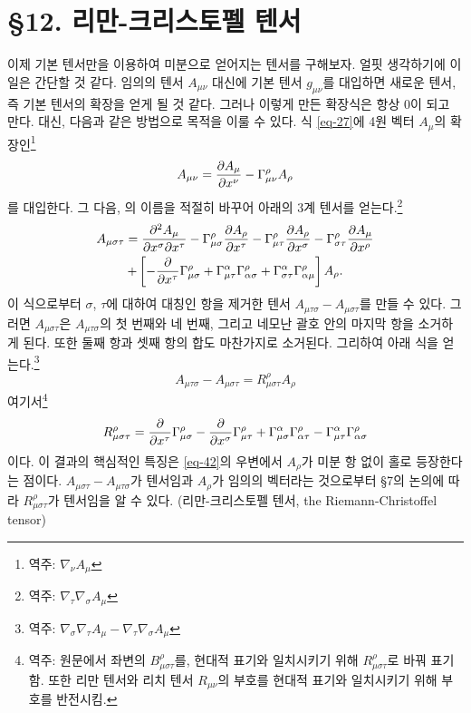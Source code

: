 \documentclass[b5paper]{article}
\begin{document}
\section*{\S 12. 리만-크리스토펠 텐서}
이제 기본 텐서만을 이용하여 미분으로 얻어지는 텐서를 구해보자. 얼핏 생각하기에 이 일은 간단할 것 같다. 임의의 텐서 $A_{\mu\nu}$ 대신에 기본 텐서 $g_{\mu\nu}$를 대입하면 새로운 텐서, 즉 기본 텐서의 확장을 얻게 될 것 같다. 그러나 이렇게 만든 확장식은 항상 0이 되고 만다. 대신, 다음과 같은 방법으로 목적을 이룰 수 있다. 식 \eqref{eq-27}에 4원 벡터 $A_\mu$의 확장인\footnote{역주: $\nabla_\nu A_\mu$}
\begin{equation*}
	A_{\mu\nu}={\frac{{\partial}{A_\mu}}{{\partial}{x^\nu}}}-\Gamma_{\mu\nu}^\rho A_\rho
\end{equation*}
를 대입한다. 그 다음, \ind{}의 이름을 적절히 바꾸어 아래의 3계 텐서를 얻는다.\footnote{역주: $\nabla_\tau \nabla_\sigma A_\mu$}
\begin{gather*}
	A_{\mu\sigma\tau}={\frac{{\partial^2}{A_\mu}}{{\partial}{x^\sigma}{\partial}{x^\tau}}}
	-\Gamma_{\mu\sigma}^{\rho}{\frac{{\partial}{A_\rho}}{{\partial}{x^\tau}}}
	-\Gamma_{\mu\tau}^{\rho}{\frac{{\partial}{A_\rho}}{{\partial}{x^\sigma}}}
	-\Gamma_{\sigma\tau}^{\rho}{\frac{{\partial}{A_\mu}}{{\partial}{x^\rho}}}\\
	+\left[
	-{\frac{{\partial}{}}{{\partial}{x^\tau}}}\Gamma_{\mu\sigma}^{\rho}
	+\Gamma_{\mu\tau}^{\alpha}\Gamma_{\alpha\sigma}^{\rho}
	+\Gamma_{\sigma\tau}^{\alpha}\Gamma_{\alpha\mu}^{\rho}
	\right] A_\rho .
\end{gather*}
이 식으로부터 $\sigma$, $\tau$에 대하여 대칭인 항을 제거한 텐서 $A_{\mu\tau\sigma}-A_{\mu\sigma\tau}$를 만들 수 있다.
 그러면 $A_{\mu\sigma\tau}$은 $A_{\mu\tau\sigma}$의 첫 번째와 네 번째, 그리고 네모난 괄호 안의 마지막 항을 소거하게 된다. 또한 둘째 항과 셋째 항의 합도 마찬가지로 소거된다. 그리하여 아래 식을 얻는다.\footnote{역주: $\nabla_\sigma \nabla_\tau A_\mu - \nabla_\tau \nabla_\sigma A_\mu
 	$}
\begin{equation} \label{eq-42}
	A_{\mu\tau\sigma}-A_{\mu\sigma\tau}
	= R_{\mu\sigma\tau}^\rho A_\rho
\end{equation} 
여기서\footnote{역주: 원문에서 좌변의 $B_{\mu\sigma\tau}^\rho$를, 현대적 표기와 일치시키기 위해 $R_{\mu\sigma\tau}^\rho$로 바꿔 표기함. 또한 리만 텐서와 리치 텐서 $R_{\mu\nu}$의 부호를 현대적 표기와 일치시키기 위해 부호를 반전시킴.} 
\begin{equation} \label{eq-43}
	R_{\mu\sigma\tau}^\rho = {\frac{{\partial}{}}{{\partial}{x^\tau}}}\Gamma_{\mu\sigma}^{\rho}
	- {\frac{{\partial}{}}{{\partial}{x^\sigma}}}\Gamma_{\mu\tau}^{\rho}
	+ \Gamma_{\mu\sigma}^{\alpha}\Gamma_{\alpha\tau}^{\rho}
	- \Gamma_{\mu\tau}^{\alpha}\Gamma_{\alpha\sigma}^{\rho}
\end{equation}
이다. 이 결과의 핵심적인 특징은 \eqref{eq-42}의 우변에서 $A_\rho$가 미분 항 없이 홀로 등장한다는 점이다. $A_{\mu\sigma\tau}-A_{\mu\tau\sigma}$가 텐서임과 $A_\rho$가 임의의 벡터라는 것으로부터 \S 7의 논의에 따라 $R_{\mu\sigma\tau}^\rho$가 텐서임을 알 수 있다. (리만-크리스토펠 텐서, the Riemann-Christoffel tensor)
\end{document}
